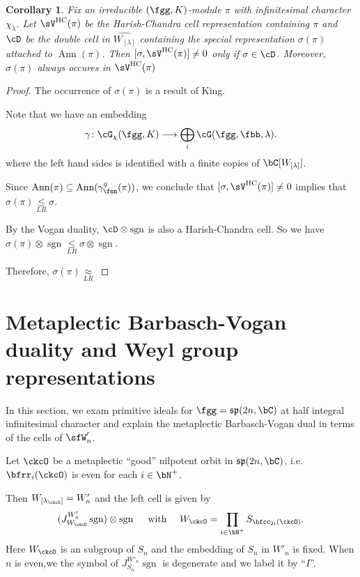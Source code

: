 \documentclass[12pt,a4paper]{amsart}
\def\fsp{\mathfrak{sp}}
\DeclareMathOperator{\Ann}{Ann}
\newcommand{\sgn}{\operatorname{sgn}}
\numberwithin{equation}{section}
\newtheorem{cor}[thm]{Corollary}
\theoremstyle{remark}
\def\leqLR{\mathrel{\mathop{\leq}\limits_{\scriptscriptstyle LR}}}
\def\approxLR{\mathrel{\mathop{\approx}\limits_{\scriptscriptstyle LR}}}
\begin{document}
\def\VHC{\sV^{\mathrm{HC}}}
\begin{cor}
  Fix an irreducible $(\fgg,K)$-module $\pi$ with infinitesimal character
  $\chi_{\lambda}$. Let $\VHC(\pi)$ be the Harish-Chandra cell representation
  containing $\pi$ and $\cD$ be the double cell in $\widehat{W_{[\lambda]}}$
  containing the special representation $\sigma(\pi)$attached to $\Ann(\pi)$.
  Then $[\sigma, \VHC(\pi)]\neq 0$ only if $\sigma \in \cD$.
  Moreover, $\sigma(\pi)$ always occures in $\VHC(\pi)$
\end{cor}
\begin{proof}
  The occurrence of $\sigma(\pi)$ is a result of King.

  Note that we have an embedding
  \[
    \gamma \colon \Grt_{\chi}(\fgg,K)\longrightarrow \bigoplus_{i}\Grt(\fgg,\fbb,\lambda).
  \]
  where the left hand sides is identified with a finite copies of
  $\bC[W_{[\lambda]}]$.

  Since $\Ann(\pi)\subseteq \Ann (\gamma_{\fnn}^{q}(\pi))$,
  we conclude that $[\sigma, \VHC(\pi)]\neq 0$ implies that
  $\sigma(\pi)\leqLR \sigma$.

  By the Vogan duality, $\cD\otimes \sgn$ is also a Harish-Chandra cell.
  So we have $\sigma(\pi)\otimes \sgn \leqLR \sigma\otimes \sgn$.

  Therefore, $\sigma(\pi)\approxLR$
\end{proof}


\section{Metaplectic Barbasch-Vogan duality and Weyl group representations}

In this section, we exam primitive ideals for $\fgg=\fsp(2n,\bC)$ at half
integral infinitesimal character and explain the metaplectic Barbasch-Vogan dual
in terms of the cells of $\sfW'_{n}$.

Let $\ckcO$ be a metaplectic ``good'' nilpotent orbit in $\fsp(2n,\bC)$, i.e.
$\bfrr_i(\ckcO)$ is even for each $i\in \bN^+$.

Then $W_{[\lambda_{\ckcO}]} = W'_n$ and the left cell is given by
\[
(J_{W_\ckcO}^{W'_n} \sgn) \otimes \sgn \quad \text{ with } \quad W_\ckcO = \prod_{i\in \bN^+} S_{\bfcc_{2i}(\ckcO)}.
\]
Here $W_\ckcO$ is an subgroup of $S_n$ and the embedding of $S_n$ in $W'_n$ is fixed.
When $n$ is even,we the symbol of $J_{S_n}^{W'_n} \sgn$ is degenerate and we label it by ``$I$''.
\end{document}
